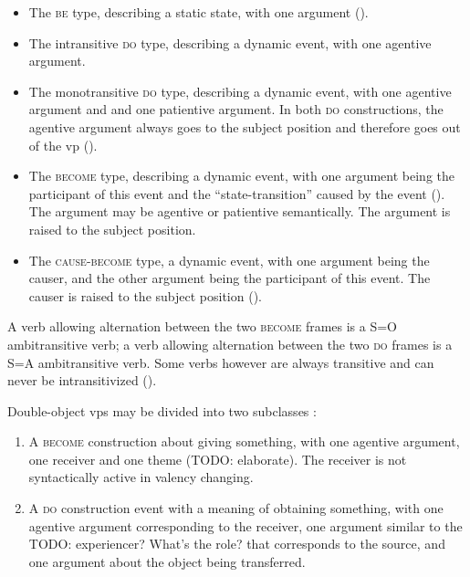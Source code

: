 \documentclass[UTF8, a4paper, oneside, scheme=plain, 12pt]{ctexrep}
\newcommand*{\citesec}[1]{\S~{#1}}
\newcommand*{\category}[1]{\textsc{#1}}
\begin{document}
\begin{itemize}
    \item The \category{be} type, describing a static state, with one argument
    ().
    \item The intransitive \category{do} type, describing a dynamic event, with one agentive argument.
    \item The monotransitive \category{do} type, describing a dynamic event,  
        with one agentive argument and 
        and one patientive argument.
        In both \category{do} constructions, 
        the agentive argument always goes to the subject position 
        and therefore goes out of the \acs{vp}
        ().
    \item The \category{become} type, describing a dynamic event, 
        with one argument being the participant of this event 
        and the ``state-transition'' caused by the event (). 
        The argument may be agentive or patientive semantically.
        The argument is raised to the subject position.
    \item The \category{cause-become} type, a dynamic event, 
        with one argument being the causer, 
        and the other argument being the participant of this event.
        The causer is raised to the subject position
        ().
\end{itemize}
A verb allowing alternation between the two \category{become} frames 
is a S=O ambitransitive verb;
a verb allowing alternation between the two \category{do} frames 
is a S=A ambitransitive verb. 
Some verbs however are always transitive 
and can never be intransitivized
(). 

Double-object \acs{vp}s may be divided into 
two subclasses
\citep[\citesec{7.2}]{deng2010formal}:
\begin{enumerate}
    \item A \category{become} construction about giving something,
        with one agentive argument, 
        one receiver and one theme (TODO: elaborate).
        The receiver is not syntactically active 
        in valency changing. 
    \item A \category{do} construction event with a meaning of obtaining something,
        with one agentive argument corresponding to the receiver, 
        one argument similar to the TODO: experiencer? What's the role? that corresponds to the source, 
        and one argument about the object being transferred.
\end{enumerate}
\end{document}
